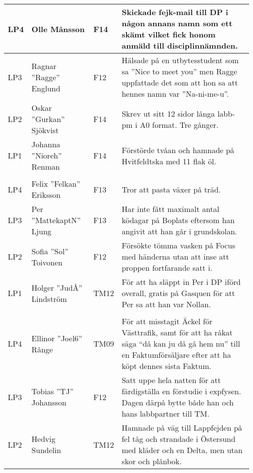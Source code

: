 \documentclass[a4paper]{article}
\begin{document}
\begin{longtable}{p{5mm}>{\raggedright\arraybackslash}p{30mm}p{10mm}p{108mm}}
LP4 & Olle Månsson & F14 & Skickade fejk-mail till DP i någon annans namn som ett skämt vilket fick honom anmäld till disciplinnämnden.\\ \hline

LP3 & Ragnar ''Ragge'' Englund & F12 & Hälsade på en utbytesstudent som sa ''Nice to meet you'' men Ragge uppfattade det som att hon sa att hennes namn var ''Na-ni-me-u''.\\ \hline

LP2 & Oskar ''Gurkan'' Sjökvist & F14 & Skrev ut sitt 12 sidor långa labb-pm i A0 format. Tre gånger.\\ \hline

LP1 & Johanna ''Nioreh'' Renman & F14 & Förstörde tvåan och hamnade på Hvitfeldtska med 11 flak öl. \\ \hline 

\rowcolor{veryLightGray} \multicolumn{4}{l}{\textbf{2014/2015}} \\ \hline

LP4 & Felix ''Felkan'' Eriksson & F13 & Tror att pasta växer på träd. \\ \hline 

LP3 & Per ''MattekaptN'' Ljung & F13 & Har inte fått maximalt antal ködagar på Boplats eftersom han angivit att han går i grundskolan. \\ \hline 

LP2 & Sofia ''Sol'' Toivonen & F12 & Försökte tömma vasken på Focus med händerna utan att inse att proppen fortfarande satt i. \\ \hline 

LP1 & Holger ''JudÅ'' Lindström & TM12 & För att ha släppt in Per i DP iförd overall, gratis på Gasquen för att Per sa att han var Nollan. \\ \hline

\rowcolor{veryLightGray} \multicolumn{4}{l}{\textbf{2013/2014}} \\ \hline

LP4 & Ellinor ''Joel6'' Rånge & TM09 & För att misstagit Äckel för Västtrafik, samt för att ha råkat säga ``då kan ju då gå hem nu'' till en Faktumförsäljare efter att ha köpt dennes sista Faktum.\\ \hline

LP3 & Tobias ''TJ'' Johansson & F12 & Satt uppe hela natten för att färdigställa en förstudie i expfysen. Dagen därpå bytte både
han och hans labbpartner till TM.\\ \hline

LP2 & Hedvig Sundelin & TM12 & Hamnade på väg till Lappfejden på fel tåg och strandade i Östersund med kläder och en Delta, men utan skor och plånbok.\\ \hline


\end{longtable}
\end{document}
